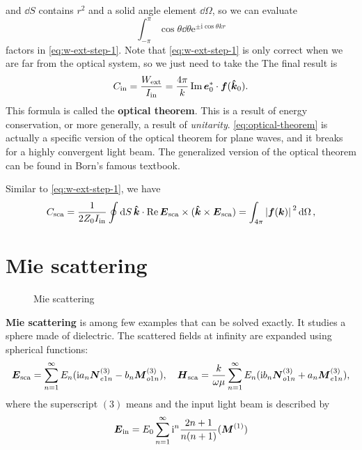 \documentclass[hyperref, a4paper]{article}
\newcommand*{\ii}{\mathrm{i}}
\newcommand*{\ee}{\mathrm{e}}
\newcommand*{\concept}[1]{{\textbf{#1}}}
\begin{document}
and $\dd{S}$ contains $r^2$ and a solid angle element $\dd{\Omega}$, so we can evaluate   
\[
    \int_{-\pi}^\pi \cos \theta \dd{\theta} \ee^{\pm \ii \cos \theta k r}
\]
factors in \eqref{eq:w-ext-step-1}. Note that \eqref{eq:w-ext-step-1} is only correct when we are 
far from the optical system, so we just need to take the 
The final result is 
\begin{equation}
    C_\text{in} = \frac{W_\text{ext}}{I_\text{in}} = \frac{4 \pi}{k} \Im \vb*{e}_0^* \cdot \vb*{f}(\vu*{k}_0).
    \label{eq:optical-theorem}
\end{equation}
This formula is called the \concept{optical theorem}. This is a result of energy conservation, or 
more generally, a result of \emph{unitarity}. 
\eqref{eq:optical-theorem} is actually a specific version of the optical theorem for plane waves, 
and it breaks for a highly convergent light beam. The generalized version of the optical theorem 
can be found in Born's famous textbook.

Similar to \eqref{eq:w-ext-step-1}, we have 
\begin{equation}
    C_\text{sca} = \frac{1}{2 Z_0 I_\text{in}} \oint \dd{S} \vu*{k} \cdot \Re \vb*{E}_\text{sca} \times (\vu*{k} \times \vb*{E}_\text{sca}) = \int_{4\pi} \abs*{\vb*{f}(\vb*{k})}^2 \dd{\Omega},
\end{equation}

\section{Mie scattering}

\begin{figure}
    \centering
    
    \caption{Mie scattering}
\end{figure}

\concept{Mie scattering} is among few examples that can be solved exactly. It studies a sphere made of 
dielectric. The scattered fields at infinity are expanded using spherical functions:
\begin{equation}
    \vb*{E}_\text{sca} = \sum_{n=1}^\infty E_n (\ii a_n \vb*{N}^{(3)}_{e1n} - b_n \vb*{M}^{(3)}_{o1n}), \quad 
    \vb*{H}_\text{sca} = \frac{k}{\omega \mu} \sum_{n=1}^\infty E_n (\ii b_n \vb*{N}^{(3)}_{o1n} + a_n \vb*{M}^{(3)}_{e1n}),
\end{equation}
where the superscript $(3)$ means %
and the input light beam is described by 
\begin{equation}
    \vb*{E}_\text{in} = E_0 \sum_{n=1}^\infty \ii^n \frac{2n+1}{n(n+1)} (\vb*{M}^{(1)})
\end{equation}
\end{document}
